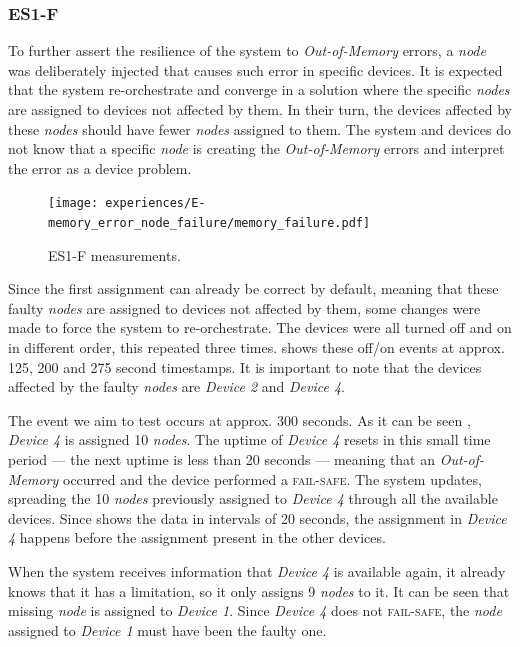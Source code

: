 
\subsubsection{ES1-F}

To further assert the resilience of the system to \textit{Out-of-Memory} errors, a \textit{node} was deliberately injected that causes such error in specific devices. It is expected that the system re-orchestrate and converge in a solution where the specific \textit{nodes} are assigned to devices not affected by them. In their turn, the devices affected by these \textit{nodes} should have fewer \textit{nodes} assigned to them. The system and devices do not know that a specific \textit{node} is creating the \textit{Out-of-Memory} errors and interpret the error as a device problem.

\begin{figure}[h]
\centering
\texttt{[image: experiences/E-memory\_error\_node\_failure/memory\_failure.pdf]}
\caption[ES1-F measurements]{ES1-F measurements.}\label{fig:experiment_e_graph}
\end{figure}

Since the first assignment can already be correct by default, meaning that these faulty \textit{nodes} are assigned to devices not affected by them, some changes were made to force the system to re-orchestrate. The devices were all turned off and on in different order, this repeated three times.  shows these off/on events at approx. 125, 200 and 275 second timestamps. It is important to note that the devices affected by the faulty \textit{nodes} are \textit{Device 2} and \textit{Device 4}.

The event we aim to test occurs at approx. 300 seconds. As it can be seen , \textit{Device 4} is assigned 10 \textit{nodes}. The uptime of \textit{Device 4} resets in this small time period --- the next uptime is less than 20 seconds --- meaning that an \textit{Out-of-Memory} occurred and the device performed a \textsc{fail-safe}. The system updates, spreading the 10 \textit{nodes} previously assigned to \textit{Device 4} through all the available devices. Since  shows the data in intervals of 20 seconds, the assignment in \textit{Device 4} happens before the assignment present in the other devices.

When the system receives information that \textit{Device 4} is available again, it already knows that it has a limitation, so it only assigns 9 \textit{nodes} to it. It can be seen that missing \textit{node} is assigned to \textit{Device 1}. Since \textit{Device 4} does not \textsc{fail-safe}, the \textit{node} assigned to \textit{Device 1} must have been the faulty one.

